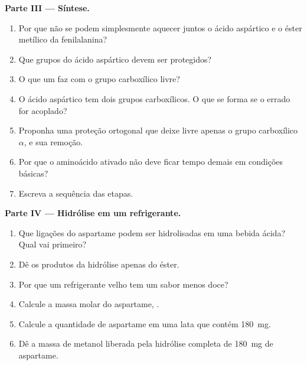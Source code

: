 \begin{problem}
\medskip
\noindent\textbf{Parte III --- Síntese.}
\begin{enumerate}[resume]
  \item Por que não se podem simplesmente aquecer juntos o ácido aspártico e o éster metílico da fenilalanina?
  \item Que grupos do ácido aspártico devem ser protegidos?
  \item O que um  faz com o grupo carboxílico livre?
  \item O ácido aspártico tem dois grupos carboxílicos. O que se forma se o errado for acoplado?
  \item Proponha uma proteção ortogonal que deixe livre apenas o grupo carboxílico $\alpha$, e sua
        remoção.
  \item Por que o aminoácido ativado não deve ficar tempo demais em condições básicas?
  \item Escreva a sequência das etapas.
\end{enumerate}

\medskip
\noindent\textbf{Parte IV --- Hidrólise em um refrigerante.}
\begin{enumerate}[resume]
  \item Que ligações do aspartame podem ser hidrolisadas em uma bebida ácida? Qual vai primeiro?
  \item Dê os produtos da hidrólise apenas do éster.
  \item Por que um refrigerante velho tem um sabor menos doce?
  \item Calcule a massa molar do aspartame, .
  \item Calcule a quantidade de aspartame em uma lata que contém \qty{180}{mg}.
  \item Dê a massa de metanol liberada pela hidrólise completa de \qty{180}{mg} de
        aspartame.
\end{enumerate}
\end{problem}
